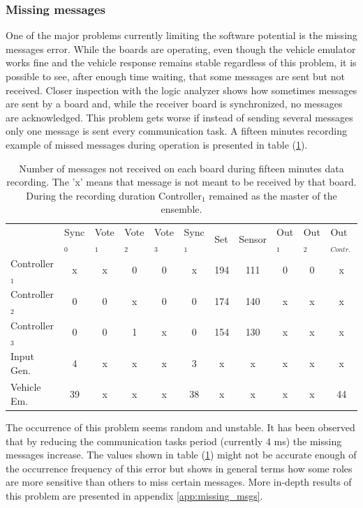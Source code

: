 \documentclass[table,xcdraw]{article}
\begin{document}
\subsubsection{Missing messages}
One of the major problems currently limiting the software potential is the missing messages error. While the boards are operating, even though the vehicle emulator works fine and the vehicle response remains stable regardless of this problem, it is possible to see, after enough time waiting, that some messages are sent but not received. Closer inspection with the logic analyzer shows how sometimes messages are sent by a board and, while the receiver board is synchronized, no messages are acknowledged. This problem gets worse if instead of sending several messages only one message is sent every communication task. A fifteen minutes recording example of missed messages during operation is presented in table (\ref{tab:missed_msgs}).

\begin{table}[h!]
\centering
\begin{tabular}{lcccccccccc}
 & \multicolumn{1}{l}{Sync$_0$} & \multicolumn{1}{l}{Vote$_1$} & \multicolumn{1}{l}{Vote$_2$} & \multicolumn{1}{l}{Vote$_3$} & \multicolumn{1}{l}{Sync$_1$} & \multicolumn{1}{l}{Set} & \multicolumn{1}{l}{Sensor} & \multicolumn{1}{l}{Out$_1$} & \multicolumn{1}{l}{Out$_2$} & \multicolumn{1}{l}{Out$_{Contr.}$} \\
Controller$_1$ & x & x & 0 & 0 & x & 194 & 111 & 0 & 0 & x \\
Controller$_2$ & 0 & 0 & x & 0 & 0 & 174 & 140 & x & x & x \\
Controller$_3$ & 0 & 0 & 1 & x & 0 & 154 & 130 & x & x & x \\
Input Gen. & 4 & x & x & x & 3 & x & x & x & x & x \\
Vehicle Em. & 39 & x & x & x & 38 & x & x & x & x & 44
\end{tabular}
\caption{Number of messages not received on each board during fifteen minutes data recording. The 'x' means that message is not meant to be received by that board. During the recording duration Controller$_1$ remained as the master of the ensemble.}
\label{tab:missed_msgs}
\end{table}

The occurrence of this problem seems random and unstable. It has been observed that by reducing the communication tasks period (currently 4 ms) the missing messages increase. The values shown in table (\ref{tab:missed_msgs}) might not be accurate enough of the occurrence frequency of this error but shows in general terms how some roles are more sensitive than others to miss certain messages. More in-depth results of this problem are presented in appendix \ref{app:missing_msgs}. 
\end{document}
